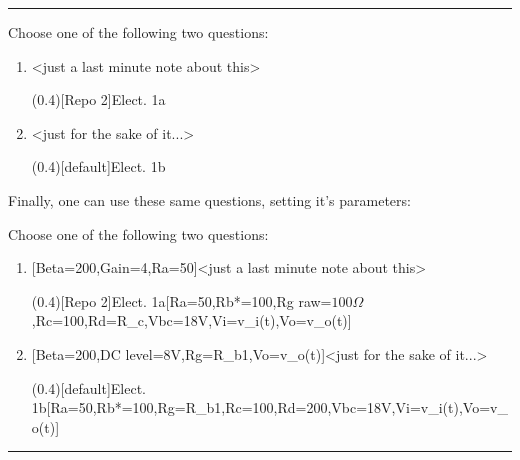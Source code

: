 \documentclass[10pt]{article}
\begin{document}


\hrule\relax\vspace{0.5ex}

Choose one of the following two questions:

\begin{enumerate}
  \item {}<just a last minute note about this>\par
  \ftikzQuestion(0.4)[Repo 2]{Elect. 1a}
  
  \item {}<just for the sake of it...>\par
  \ftikzQuestion(0.4)[default]{Elect. 1b}
\end{enumerate}

Finally, one can use these same questions, setting it's parameters:

\begin{codestore}[QuestionUse]
Choose one of the following two questions:

\begin{enumerate}
  \item {}[Beta=200,Gain=4,Ra=50\Omega]<just a last minute note about this>\par
  \ftikzQuestion(0.4)[Repo 2]{Elect. 1a}[Ra=50\Omega,Rb*=100\Omega,Rg raw=$100\Omega$,Rc=100\Omega,Rd=R_c,Vbc=18V,Vi=v_i(t),Vo=v_o(t)]
  
  \item {}[Beta=200,DC level=8V,Rg=R_{b1},Vo=v_o(t)]<just for the sake of it...>\par
  \ftikzQuestion(0.4)[default]{Elect. 1b}[Ra=50\Omega,Rb*=100\Omega,Rg=R_{b1},Rc=100\Omega,Rd=200\Omega,Vbc=18V,Vi=v_i(t),Vo=v_o(t)]
\end{enumerate}
\end{codestore}


\hrule\relax\vspace{0.5ex}
\end{document}
